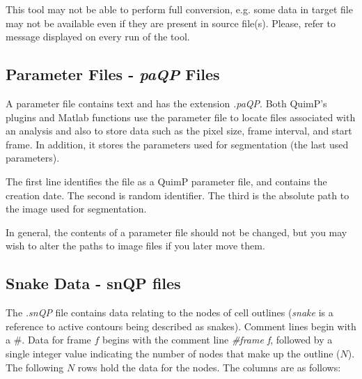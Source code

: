 \documentclass[a4paper,12pt]{article}
\begin{document}
This tool may not be able to perform full conversion, e.g. some data in target file may not be available even if they are present in source file(s). Please, refer to message displayed on every run of the tool.   
  
\subsection{Parameter Files - \textit{paQP} Files}
\label{paQP}

A parameter file contains text and has the extension \textit{.paQP}.  Both QuimP's plugins and
Matlab functions use the parameter file to locate files associated with an analysis and also to store data such as the
pixel size, frame interval, and start frame.  In addition, it stores the parameters used for segmentation
(the last used parameters).

The first line identifies the file as a QuimP parameter file, and contains the creation date.
The second is random identifier.
The third is the absolute path to the image used for segmentation.
 
In general, the contents of a parameter file should not be changed, but you may wish to alter the paths to
image files if you later move them.
 

\subsection{Snake Data - snQP files}
\label{snQP}

The \textit{.snQP} file contains data relating to the nodes of cell outlines (\textit{snake} is a reference to active contours being 
described as snakes).   Comment lines
begin with a \#.  Data for frame $f$ begins with the comment line \textit{\#frame f}, followed by a single integer value
indicating the number of nodes that make up the outline ($N$).  The following $N$ rows hold the data for the nodes. The 
columns are as follows:
\end{document}
